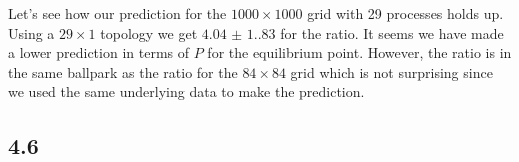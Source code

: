 Let's see how our prediction for the $1000\times1000$ grid with 29 processes holds up. Using a $29\times1$ topology we get $\num{4.04(1.83)}$ for the ratio. It seems we have made a lower prediction in terms of $P$ for the equilibrium point. However, the ratio is in the same ballpark as the ratio for the $84\times84$ grid which is not surprising since we used the same underlying data to make the prediction.\\
\subsection{4.6}

